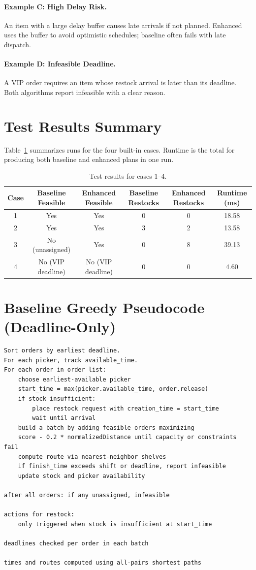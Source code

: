 \documentclass[11pt]{article}
\begin{document}
\paragraph{Example C: High Delay Risk.}
An item with a large delay buffer causes late arrivals if not planned. Enhanced uses the buffer to avoid optimistic schedules; baseline often fails with late dispatch.

\paragraph{Example D: Infeasible Deadline.}
A VIP order requires an item whose restock arrival is later than its deadline. Both algorithms report infeasible with a clear reason.

\section{Test Results Summary}
Table~\ref{tab:test-results} summarizes runs for the four built-in cases. Runtime is the total for producing both baseline and enhanced plans in one run.

\begin{table}[h]
\centering
\begin{tabular}{|c|c|c|c|c|c|}
\hline
Case & Baseline Feasible & Enhanced Feasible & Baseline Restocks & Enhanced Restocks & Runtime (ms) \\
\hline
1 & Yes & Yes & 0 & 0 & 18.58 \\
2 & Yes & Yes & 3 & 2 & 13.58 \\
3 & No (unassigned) & Yes & 0 & 8 & 39.13 \\
4 & No (VIP deadline) & No (VIP deadline) & 0 & 0 & 4.60 \\
\hline
\end{tabular}
\caption{Test results for cases 1--4.}
\label{tab:test-results}
\end{table}

\section{Baseline Greedy Pseudocode (Deadline-Only)}
\begin{verbatim}
Sort orders by earliest deadline.
For each picker, track available_time.
For each order in order list:
    choose earliest-available picker
    start_time = max(picker.available_time, order.release)
    if stock insufficient:
        place restock request with creation_time = start_time
        wait until arrival
    build a batch by adding feasible orders maximizing
    score - 0.2 * normalizedDistance until capacity or constraints fail
    compute route via nearest-neighbor shelves
    if finish_time exceeds shift or deadline, report infeasible
    update stock and picker availability

after all orders: if any unassigned, infeasible

actions for restock:
    only triggered when stock is insufficient at start_time

deadlines checked per order in each batch

times and routes computed using all-pairs shortest paths
\end{verbatim}
\end{document}
